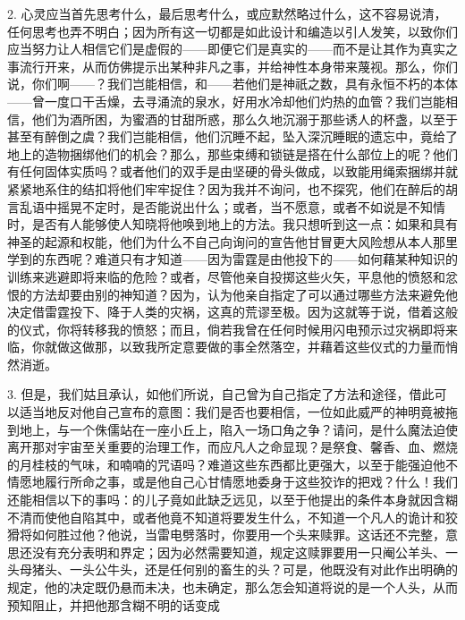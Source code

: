 2. 心灵应当首先思考什么，最后思考什么，或应默然略过什么，这不容易说清，任何思考也弄不明白；因为所有这一切都是如此设计和编造以引人发笑，以致你们应当努力让人相信它们是虚假的——即便它们是真实的——而不是让其作为真实之事流行开来，从而仿佛提示出某种非凡之事，并给神性本身带来蔑视。那么，你们说，你们啊——？我们岂能相信，和——若他们是神祇之数，具有永恒不朽的本体——曾一度口干舌燥，去寻涌流的泉水，好用水冷却他们灼热的血管？我们岂能相信，他们为酒所困，为蜜酒的甘甜所惑，那么久地沉溺于那些诱人的杯盏，以至于甚至有醉倒之虞？我们岂能相信，他们沉睡不起，坠入深沉睡眠的遗忘中，竟给了地上的造物捆绑他们的机会？那么，那些束缚和锁链是搭在什么部位上的呢？他们有任何固体实质吗？或者他们的双手是由坚硬的骨头做成，以致能用绳索捆绑并就紧紧地系住的结扣将他们牢牢捉住？因为我并不询问，也不探究，他们在醉后的胡言乱语中摇晃不定时，是否能说出什么；或者，当不愿意，或者不如说是不知情时，是否有人能够使人知晓将他唤到地上的方法。我只想听到这一点：如果和具有神圣的起源和权能，他们为什么不自己向询问的宣告他甘冒更大风险想从本人那里学到的东西呢？难道只有才知道——因为雷霆是由他投下的——如何藉某种知识的训练来逃避即将来临的危险？或者，尽管他亲自投掷这些火矢，平息他的愤怒和忿恨的方法却要由别的神知道？因为，认为他亲自指定了可以通过哪些方法来避免他决定借雷霆投下、降于人类的灾祸，这真的荒谬至极。因为这就等于说，借着这般的仪式，你将转移我的愤怒；而且，倘若我曾在任何时候用闪电预示过灾祸即将来临，你就做这做那，以致我所定意要做的事全然落空，并藉着这些仪式的力量而悄然消逝。\par

3. 但是，我们姑且承认，如他们所说，自己曾为自己指定了方法和途径，借此可以适当地反对他自己宣布的意图：我们是否也要相信，一位如此威严的神明竟被拖到地上，与一个侏儒站在一座小丘上，陷入一场口角之争？请问，是什么魔法迫使离开那对宇宙至关重要的治理工作，而应凡人之命显现？是祭食、馨香、血、燃烧的月桂枝的气味，和喃喃的咒语吗？难道这些东西都比更强大，以至于能强迫他不情愿地履行所命之事，或是他自己心甘情愿地委身于这些狡诈的把戏？什么！我们还能相信以下的事吗：的儿子竟如此缺乏远见，以至于他提出的条件本身就因含糊不清而使他自陷其中，或者他竟不知道将要发生什么，不知道一个凡人的诡计和狡猾将如何胜过他？他说，当雷电劈落时，你要用一个头来赎罪。这话还不完整，意思还没有充分表明和界定；因为必然需要知道，规定这赎罪要用一只阉公羊头、一头母猪头、一头公牛头，还是任何别的畜生的头？可是，他既没有对此作出明确的规定，他的决定既仍悬而未决，也未确定，那么怎会知道将说的是一个人头，从而预知阻止，并把他那含糊不明的话变成\par

